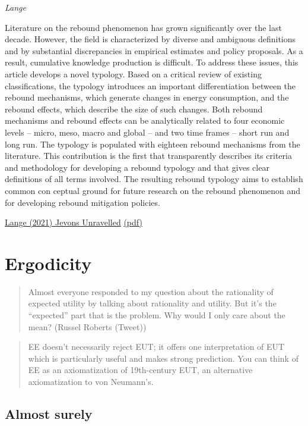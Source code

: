 \documentclass[
]{book}
\begin{document}
\emph{Lange}

Literature on the rebound phenomenon has grown significantly over the last decade. However, the field is
characterized by diverse and ambiguous definitions and by substantial discrepancies in empirical estimates and
policy proposals. As a result, cumulative knowledge production is difficult. To address these issues, this article
develops a novel typology. Based on a critical review of existing classifications, the typology introduces an
important differentiation between the rebound mechanisms, which generate changes in energy consumption, and
the rebound effects, which describe the size of such changes. Both rebound mechanisms and rebound effects can
be analytically related to four economic levels -- micro, meso, macro and global -- and two time frames -- short run
and long run. The typology is populated with eighteen rebound mechanisms from the literature. This contribution
is the first that transparently describes its criteria and methodology for developing a rebound typology and that
gives clear definitions of all terms involved. The resulting rebound typology aims to establish common con­
ceptual ground for future research on the rebound phenomenon and for developing rebound mitigation policies.

\href{https://www.sciencedirect.com/science/article/pii/S221462962100075X}{Lange (2021) Jevons Unravelled}
\href{pdf/Lange_2021_Jevons_Unravelled.pdf}{(pdf)}

\hypertarget{ergodicity}{%
\chapter{Ergodicity}\label{ergodicity}}

\begin{quote}
Almost everyone responded to my question about the rationality of expected utility by talking about rationality and utility. But it's the ``expected'' part that is the problem. Why would I only care about the mean? (Russel Roberts (Tweet))
\end{quote}

\begin{quote}
EE doesn't necessarily reject EUT; it offers one interpretation of EUT which is particularly useful and makes strong prediction. You can think of EE as an axiomatization of 19th-century EUT, an alternative axiomatization to von Neumann's.
\end{quote}

\hypertarget{almost-surely}{%
\section{Almost surely}\label{almost-surely}}
\end{document}
